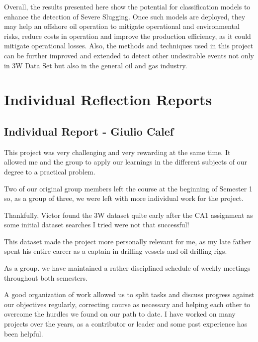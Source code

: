 \documentclass{article}
\begin{document}
Overall, the results presented here show the potential for classification models to enhance the detection of Severe Slugging. Once such models are deployed, they may help an offshore oil operation to mitigate operational and environmental risks, reduce costs in operation and improve the production efficiency, as it could mitigate operational losses. Also, the methods and techniques used in this project can be further improved and extended to detect other undesirable events not only in 3W Data Set but also in the general oil and gas industry.



\printbibliography

\appendix
\section{Individual Reflection Reports}
\subsection{Individual Report - Giulio Calef}
This project was very challenging and very rewarding at the same time. It allowed me and the group to apply our learnings in the different subjects of our degree to a practical problem.

Two of our original group members left the course at the beginning of Semester 1 so, as a group of three, we were left with more individual work for the project.

Thankfully, Victor found the 3W dataset quite early after the CA1 assignment as some initial dataset searches I tried were not that successful!

This dataset made the project more personally relevant for me, as my late father spent his entire career as a captain in drilling vessels and oil drilling rigs.

As a group. we have maintained a rather disciplined schedule of weekly meetings throughout both semesters.

A good organization of work allowed us to split tasks and discuss progress against our objectives regularly, correcting course as necessary and helping each other to overcome the hurdles we found on our path to date. I have worked on many projects over the years, as a contributor or leader and some past experience has been helpful.
\end{document}
